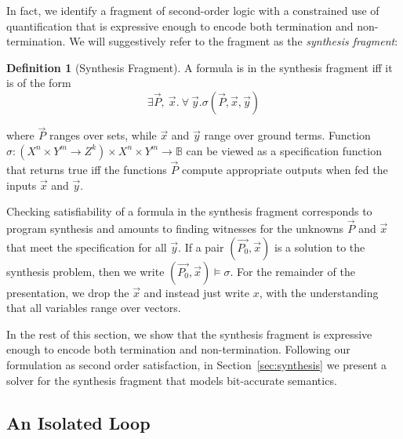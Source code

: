 \documentclass[preprint]{sigplanconf}
\theoremstyle{definition}
\newtheorem{definition}[theorem]{Definition}
\begin{document}
In fact, we identify a fragment of second-order logic with a constrained use of quantification that is expressive enough to encode both termination and non-termination.
We will suggestively refer to the fragment as the \emph{synthesis fragment}:


\begin{definition}[Synthesis Fragment]
 A formula is in the synthesis fragment iff it is of the form
 \[
  \exists \vec{P},~ \vec{x} . ~\forall~ \vec{y} . \sigma(\vec{P}, \vec{x}, \vec{y})
 \]

where $\vec{P}$ ranges over sets, while $\vec{x}$ and $\vec{y}$ range over ground terms.
Function $\sigma: (X^n \times Y^m \to Z^k) \times X^n \times Y^m  \to \mathbb{B}$ can be viewed as a specification function
that  returns true iff the functions $\vec{P}$ compute appropriate outputs
when fed the inputs $\vec{x}$ and $\vec{y}$.  
\end{definition}

Checking satisfiability of a formula in the synthesis fragment corresponds to program synthesis and
amounts to finding witnesses for the unknowns $\vec{P}$ and $\vec{x}$ that meet the specification
for all $\vec{y}$. 
If a pair $(\vec{P_0}, \vec{x})$ is a solution to the synthesis problem, then we write $(\vec{P_0}, \vec{x}) \models \sigma$.
For the remainder of the presentation, we drop the $\vec{x}$ and instead just write $x$, with the understanding
that all variables range over vectors.

In the rest of this section, we show that the synthesis fragment 
is expressive enough to encode both termination and non-termination. %
Following our formulation as second order satisfaction, %
in Section~\ref{sec:synthesis} we present a solver for the synthesis fragment that models bit-accurate semantics. 


\subsection{An Isolated Loop}
\end{document}

